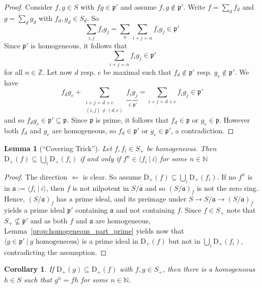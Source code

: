 \documentclass{scrartcl}
\newcommand{\N}{\mathbb{N}}
\newcommand{\Z}{\mathbb{Z}}
\newcommand{\D}[1]{\mathrm{D}_+(#1)}
\newcommand{\p}{\mathfrak{p}}
\renewcommand{\a}{\mathfrak{a}}
\newtheorem{lemma}[subsection]{Lemma}
\newtheorem{corollary}[subsection]{Corollary}
\theoremstyle{definition}
\begin{document}
\begin{proof}
    Consider $f, g \in S$ with $f g \in \p'$ and assume $f, g \notin \p'$.
    Write $f = \sum_d f_d$ and $g = \sum_d g_d$ with $f_d, g_d \in S_d$.
    So
    \begin{equation*}
        \sum_{i, j} f_i g_j = \sum_n \sum_{i + j = n} f_i g_j \in \p'
    \end{equation*}
    Since $\p'$ is homogeneous, it follows that
    \begin{equation*}
        \sum_{i + j = n} f_i g_j \in \p'
    \end{equation*}
    for all $n \in \Z$.
    Let now $d$ resp. $e$ be maximal such that $f_d \notin \p'$ resp. $g_e \notin \p'$.
    We have
    \begin{equation*}
        f_d g_e + \sum_{\substack{i + j = d + e\\(i, j) \neq (d, e)}} \underbrace{f_i g_j}_{\in \p'} = \sum_{i + j = d + e} f_i g_j \in \p'
    \end{equation*}
    and so $f_d g_e \in \p' \subseteq \p$.
    Since $\p$ is prime, it follows that $f_d \in \p$ or $g_e \in \p$.
    However both $f_d$ and $g_e$ are homogeneous, so $f_d \in \p'$ or $g_e \in \p'$, a contradiction.
\end{proof}
\begin{lemma}[``Covering Trick'']
    \label{prop:covering_trick}
    Let $f, f_i \in S_+$ be homogeneous.
    Then $\D{f} \subseteq \bigcup_i \D{f_i}$ if and only if $f^n \in \langle f_i \ | \ i \rangle$ for some $n \in \N$
\end{lemma}
\begin{proof}
    The direction $\Leftarrow$ is clear.
    So assume $\D{f} \subseteq \bigcup_i \D{f_i}$.
    If no $f^n$ is in $\a := \langle f_i \ | \ i \rangle$, then $f$ is not nilpotent in $S/\a$ and so $(S/\a)_f$ is not the zero ring.
    Hence, $(S/\a)_f$ has a prime ideal, and its preimage under $S \to S/\a \to (S/\a)_f$ yields a prime ideal $\p'$ containing $\a$ and not containing $f$.
    Since $f \in S_+$ note that $S_+ \not\subseteq \p'$ and as both $f$ and $\a$ are homogeneous, Lemma~\ref{prop:homogeneous_part_prime} yields now that $\langle g \in \p' \ | \ \text{$g$ homogeneous} \rangle$ is a prime ideal in $\D{f}$ but not in $\bigcup_i \D{f_i}$, contradicting the assumption.
\end{proof}
\begin{corollary}
    \label{prop:basic_set_inclusion_divisibility}
    If $\D{g} \subseteq \D{f}$ with $f, g \in S_+$, then there is a homogeneous $h \in S$ such that $g^n = fh$ for some $n \in \N$.
\end{corollary}
\end{document}
